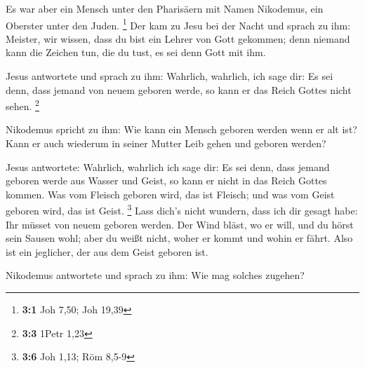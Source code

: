  Es war aber ein Mensch unter den Pharisäern mit Namen
Nikodemus, ein Oberster unter den Juden. \footnote{\textbf{3:1} Joh
  7,50; Joh 19,39}  Der kam zu Jesu bei der Nacht und
sprach zu ihm: Meister, wir wissen, dass du bist ein Lehrer von Gott
gekommen; denn niemand kann die Zeichen tun, die du tust, es sei denn
Gott mit ihm.

 Jesus antwortete und sprach zu ihm: Wahrlich, wahrlich,
ich sage dir: Es sei denn, dass jemand von neuem geboren werde, so kann
er das Reich Gottes nicht sehen. \footnote{\textbf{3:3} 1Petr 1,23}

 Nikodemus spricht zu ihm: Wie kann ein Mensch geboren
werden wenn er alt ist? Kann er auch wiederum in seiner Mutter Leib
gehen und geboren werden?

 Jesus antwortete: Wahrlich, wahrlich ich sage dir: Es sei
denn, dass jemand geboren werde aus Wasser und Geist, so kann er nicht
in das Reich Gottes kommen.  Was vom Fleisch geboren wird,
das ist Fleisch; und was vom Geist geboren wird, das ist Geist.
\footnote{\textbf{3:6} Joh 1,13; Röm 8,5-9}  Lass dich's
nicht wundern, dass ich dir gesagt habe: Ihr müsset von neuem geboren
werden.  Der Wind bläst, wo er will, und du hörst sein
Sausen wohl; aber du weißt nicht, woher er kommt und wohin er fährt.
Also ist ein jeglicher, der aus dem Geist geboren ist.

 Nikodemus antwortete und sprach zu ihm: Wie mag solches
zugehen?

